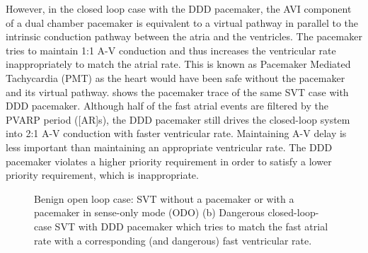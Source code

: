 However, in the closed loop case with the DDD pacemaker, the AVI component of a dual chamber pacemaker is equivalent to a virtual pathway in parallel to the intrinsic conduction pathway between the atria and the ventricles. The pacemaker tries to maintain 1:1 A-V conduction and thus increases the ventricular rate inappropriately to match the atrial rate.  This is known as Pacemaker Mediated Tachycardia (PMT) as the heart would have been safe without the pacemaker and its virtual pathway.  shows the pacemaker trace of the same SVT case with DDD pacemaker. Although half of the fast atrial events are filtered by the PVARP period ([AR]s), the DDD pacemaker still drives the closed-loop system into 2:1 A-V conduction with faster ventricular rate. Maintaining A-V delay is less important than maintaining an appropriate ventricular rate. The DDD pacemaker violates a higher priority requirement in order to satisfy a lower priority requirement, which is inappropriate.
\begin{figure}[!t]
\centering
		
\caption{\small Benign open loop case: SVT without a pacemaker or with a pacemaker in sense-only mode (ODO) (b) Dangerous closed-loop-case SVT with DDD pacemaker which tries to match the fast atrial rate with a corresponding (and dangerous) fast ventricular rate.}
\end{figure} 

